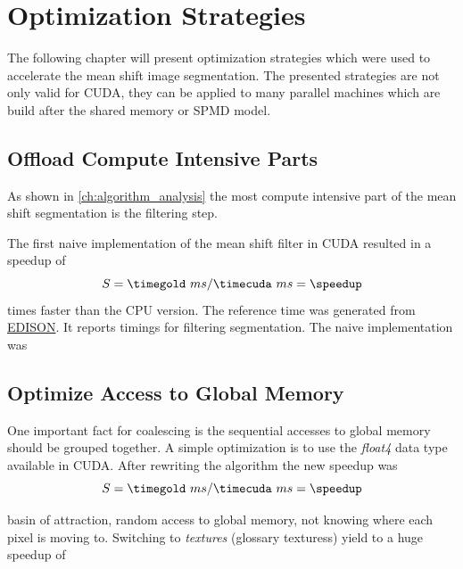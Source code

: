 \chapter{Optimization Strategies}
\label{ch:optimization}


The following chapter will present optimization strategies which were used to
accelerate the mean shift image segmentation. The presented strategies are not 
only valid for CUDA, they can be applied to many parallel machines which are 
build after the shared memory or \gls{SPMD} model.

\section{Offload Compute Intensive Parts}
\label{sec:offload_intensive}

As shown in \autoref{ch:algorithm_analysis} the most compute intensive part
of the mean shift segmentation is the filtering step. 

The first naive implementation of the mean shift filter in CUDA resulted in a
speedup of
\begin{equation*}\label{eq:speedup0}
	S = \timegold\ ms/\timecuda\ ms= \speedup
\end{equation*}
times faster than the \gls{CPU} version. The reference time was
generated from
\href{http://www.caip.rutgers.edu/riul/research/code.html}{ \gls{EDISON}}. It
reports timings for filtering segmentation. The naive implementation was 

\section*{Optimize Access to Global Memory}
\label{sec:coalescing}

One important fact for coalescing is the sequential accesses to global memory
should be grouped together. A simple optimization is to use the \emph{float4}
data type available in \gls{CUDA}. After rewriting the algorithm the new speedup
was 
\fpDiv{\speedup}{\timegold}{\timecuda}
\begin{equation*}\label{eq:speedup0}
	S = \timegold\ ms/\timecuda\ ms = \speedup
\end{equation*}

basin of attraction, random access to global memory, not knowing where each pixel
is moving to. Switching to \emph{textures} (glossary texturess) yield to a huge
speedup of 

